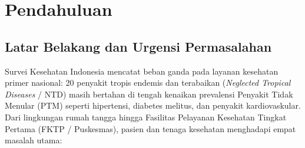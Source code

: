 
\section{Pendahuluan}

\subsection{Latar Belakang dan Urgensi Permasalahan}

Survei Kesehatan Indonesia \citep{Kemenkes2024} mencatat beban ganda pada layanan kesehatan primer nasional: 20 penyakit tropis endemis dan terabaikan (\textit{Neglected Tropical Diseases} / NTD) masih bertahan di tengah kenaikan prevalensi Penyakit Tidak Menular (PTM) seperti hipertensi, diabetes melitus, dan penyakit kardiovaskular. Dari lingkungan rumah tangga hingga Fasilitas Pelayanan Kesehatan Tingkat Pertama (FKTP / Puskesmas), pasien dan tenaga kesehatan menghadapi empat masalah utama:

